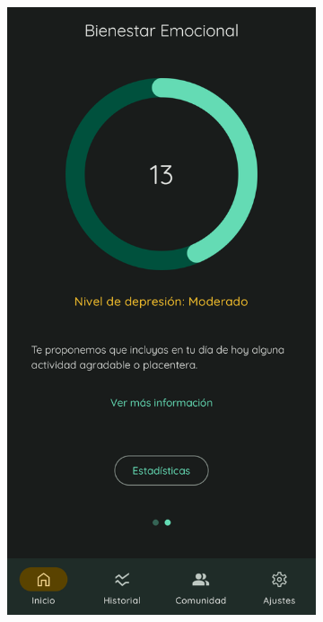                 \begin{figure}[htbp]
                	\centering
                	\begin{subfigure}[c]{0.4\textwidth}
                		\centering
                		\includegraphics[width=1\textwidth]{figures/pantallas/Inicio.png}

\end{subfigure}
\end{figure}
